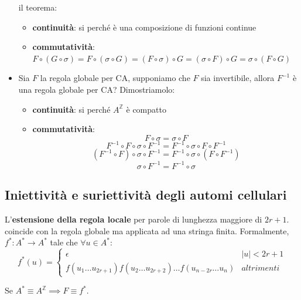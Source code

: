 \begin{itemize}
    il teorema:
    \begin{itemize}
        \item \textbf{continuità}: si perché è una composizione di funzioni continue
        \item \textbf{commutatività}: $F\circ (G\circ \sigma) = F\circ (\sigma\circ G) = (F\circ \sigma)\circ G =(\sigma\circ F)\circ G = \sigma\circ (F\circ G)$
    \end{itemize}
    \item Sia $F$ la regola globale per CA, supponiamo che $F$ sia invertibile, 
    allora $F^{-1}$ è una regola globale per CA? Dimostriamolo:
    \begin{itemize}
        \item \textbf{continuità}: si perché $A^\mathbb{Z}$ è compatto
        \item \textbf{commutatività}: $$F\circ \sigma = \sigma \circ F $$
        $$ F^{-1} \circ F\circ \sigma \circ F^{-1}= F^{-1}\circ \sigma \circ F \circ F^{-1}$$ 
        $$ (F^{-1} \circ F)\circ \sigma \circ F^{-1}= F^{-1}\circ \sigma \circ (F \circ F^{-1})$$
        $$ \sigma \circ F^{-1}= F^{-1}\circ \sigma$$
    \end{itemize}
\end{itemize}

\subsection{Iniettività e suriettività degli automi cellulari}

\begin{definizione} 
    L'\textbf{estensione della regola locale} per parole di lunghezza maggiore di 
    $2r+1$. coincide con la regola globale ma 
    applicata ad una stringa finita. Formalmente, $f^\ast: A^\ast\rightarrow A^\ast$
    tale che $\forall u\in A^\ast$:
    \begin{equation*}
        f^\ast(u) = \begin{cases}
            \epsilon & |u| < 2r+1\\
            f(u_1\dots u_{2r+1})f(u_2\dots u_{2r+2})\dots f(u_{n-2r}\dots u_{n})& altrimenti
        \end{cases}
    \end{equation*}  
\end{definizione}

\begin{nota}
    Se $A^\ast\equiv A^\mathbb{Z}\implies F \equiv f^\ast$. 
\end{nota}


